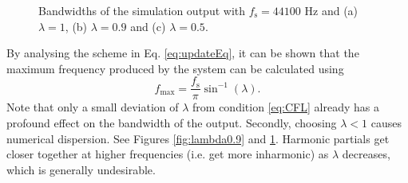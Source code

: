 \begin{figure}[ht]
    \centering
    \caption{Bandwidths of the simulation output %
    with $f_\text{s} = 44100$ Hz and 
    (a) $\lambda = 1$, (b) $\lambda = 0.9$ and (c) $\lambda = 0.5$. 
    \label{fig:bandWidths}}
\end{figure}
%
By analysing the scheme in Eq. \eqref{eq:updateEq}, it can be shown that the maximum frequency produced by the system can be calculated using \cite[Chap. 6]{bilbao2009}
\begin{equation}\label{eq:fmax}
    f_\text{max} = \frac{f_\text{s}}{\pi} \sin^{-1}(\lambda).
\end{equation}
%
Note that only a small deviation of $\lambda$ from condition \eqref{eq:CFL} already has a profound effect on the bandwidth of the output.
%
Secondly, choosing $\lambda < 1$ causes numerical dispersion. See Figures \ref{fig:lambda0.9} and \ref{fig:bandWidths}. Harmonic partials get closer together at higher frequencies (i.e. get more inharmonic) as $\lambda$ decreases, which is generally undesirable.


